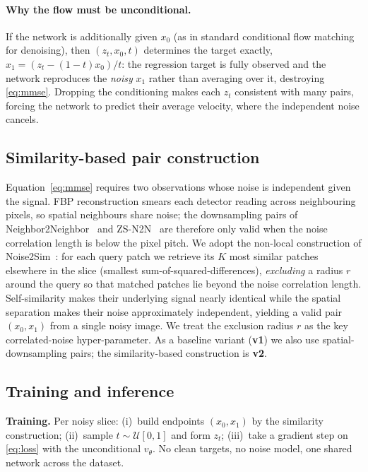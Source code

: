 \documentclass[10pt,twocolumn]{article}
\begin{document}
\paragraph{Why the flow must be unconditional.}
If the network is additionally given $x_0$ (as in standard conditional flow
matching for denoising), then $(z_t,x_0,t)$ determines the target exactly,
$x_1=(z_t-(1-t)x_0)/t$: the regression target is fully observed and the
network reproduces the \emph{noisy} $x_1$ rather than averaging over it,
destroying \eqref{eq:mmse}. Dropping the conditioning makes each $z_t$
consistent with many pairs, forcing the network to predict their average
velocity, where the independent noise cancels.

\subsection{Similarity-based pair construction}
Equation~\eqref{eq:mmse} requires two observations whose noise is
independent given the signal. FBP reconstruction smears each detector
reading across neighbouring pixels, so spatial neighbours share noise; the
downsampling pairs of Neighbor2Neighbor~\cite{huang2021neighbor2neighbor}
and ZS-N2N~\cite{mansour2023zsn2n} are therefore only valid when the noise
correlation length is below the pixel pitch. We adopt the non-local
construction of Noise2Sim~\cite{niu2020noise2sim}: for each query patch we
retrieve its $K$ most similar patches elsewhere in the slice (smallest
sum-of-squared-differences), \emph{excluding} a radius $r$ around the query
so that matched patches lie beyond the noise correlation length.
Self-similarity makes their underlying signal nearly identical while the
spatial separation makes their noise approximately independent, yielding a
valid pair $(x_0,x_1)$ from a single noisy image. We treat the exclusion
radius $r$ as the key correlated-noise hyper-parameter. As a baseline
variant (\textbf{v1}) we also use spatial-downsampling pairs; the
similarity-based construction is \textbf{v2}.

\subsection{Training and inference}
\textbf{Training.} Per noisy slice: (i)~build endpoints $(x_0,x_1)$ by the
similarity construction; (ii)~sample $t\sim\mathcal{U}[0,1]$ and form $z_t$;
(iii)~take a gradient step on \eqref{eq:loss} with the unconditional
$v_\theta$. No clean targets, no noise model, one shared network across the
dataset.
\end{document}
